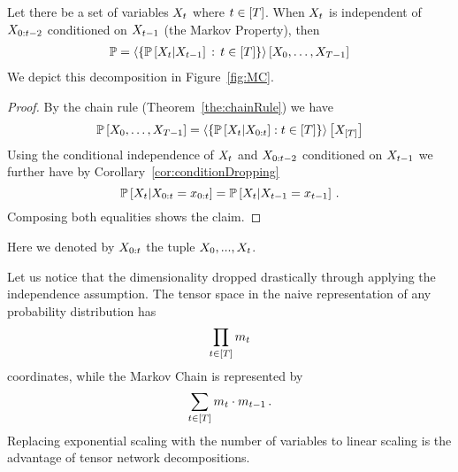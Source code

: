 \begin{theorem}\label{the:MarkovChain}
	Let there be a set of variables $X_{t}$ where $t\in[T]$.
	When $X_{t}$ is independent of $X_{0:{t-2}}$ conditioned on $X_{t-1}$ (the Markov Property), then
	\begin{align*}
		\mathbb{P} = \left\langle \{ \mathbb{P}\left[X_{t}|X_{t-1}\right]\, : \, t\in[T] \}\right\rangle \left[ 
		X_{0},\ldots,X_{T-1}
		 \right] 
	\end{align*}	
	We depict this decomposition in Figure~\ref{fig:MC}.
\end{theorem}
\begin{proof}
	By the chain rule (Theorem~\ref{the:chainRule}) we have
	\begin{align*}
	 	\mathbb{P}\left[X_{0},\ldots,X_{T-1}\right]
		= \left\langle 
		\{ \mathbb{P}\left[X_{t}|X_{0:t}\right] : t\in[T] \}
		\right\rangle \left[ X_{[T]} \right]
	\end{align*}
	Using the conditional independence of $X_{t}$ and $X_{0:{t-2}}$ conditioned on $X_{t-1}$ we further have by Corollary~\ref{cor:conditionDropping}
		\[ \mathbb{P}\left[X_{t}|X_{0:t}=x_{0:t}\right]  = \mathbb{P}\left[X_{t}|X_{t-1}=x_{t-1}\right] \, .  \]
	Composing both equalities shows the claim.
\end{proof}

Here we denoted by $X_{0:t}$ the tuple $X_{0},...,X_{t}$.

\begin{remark}
	Let us notice that the dimensionality dropped drastically through applying the independence assumption.
	The tensor space in the naive representation of any probability distribution has
		\[ \prod_{t\in[T]} m_{t}\]
	coordinates, while the Markov Chain is represented by
		\[ \sum_{t\in[T]}  m_{t}\cdot m_{t-1} \, . \]
	Replacing exponential scaling with the number of variables to linear scaling is the advantage of tensor network decompositions.
\end{remark}

